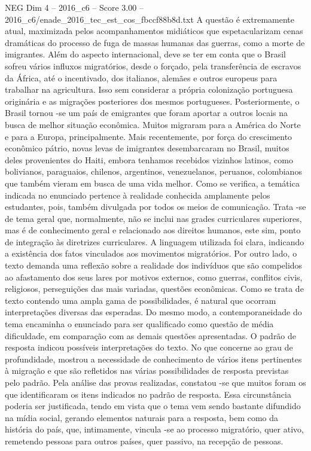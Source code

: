 \begin{textsample}{NEG Dim 4 – 2016\_c6 – Score 3.00 – 2016\_c6/enade\_2016\_tec\_est\_cos\_fbccf88b8d.txt}
A questão é extremamente atual, maximizada pelos acompanhamentos midiáticos que espetacularizam cenas dramáticas do processo de fuga de massas humanas das guerras, como a morte de imigrantes.
Além do aspecto internacional, deve se ter em conta que o Brasil sofreu vários influxos migratórios, desde o forçado, pela transferência de escravos da África, até o incentivado, dos italianos, alemães e outros europeus para trabalhar na agricultura.
Isso sem considerar a própria colonização portuguesa originária e as migrações posteriores dos mesmos portugueses.
Posteriormente, o Brasil tornou -se um país de emigrantes que foram aportar a outros locais na busca de melhor situação econômica.
Muitos migraram para a América do Norte e para a Europa, principalmente.
Mais recentemente, por força do crescimento econômico pátrio, novas levas de imigrantes desembarcaram no Brasil, muitos deles provenientes do Haiti, embora tenhamos recebidos vizinhos latinos, como bolivianos, paraguaios, chilenos, argentinos, venezuelanos, peruanos, colombianos que também vieram em busca de uma vida melhor.
Como se verifica, a temática indicada no enunciado pertence à realidade conhecida amplamente pelos estudantes, pois, também divulgada por todos os meios de comunicação.
Trata -se de tema geral que, normalmente, não se inclui nas grades curriculares superiores, mas é de conhecimento geral e relacionado aos direitos humanos, este sim, ponto de integração às diretrizes curriculares.
A linguagem utilizada foi clara, indicando a existência dos fatos vinculados aos movimentos migratórios.
Por outro lado, o texto demanda uma reflexão sobre a realidade dos indivíduos que são compelidos ao afastamento dos seus lares por motivos externos, como guerras, conflitos civis, religiosos, perseguições das mais variadas, questões econômicas.
Como se trata de texto contendo uma ampla gama de possibilidades, é natural que ocorram interpretações diversas das esperadas.
Do mesmo modo, a contemporaneidade do tema encaminha o enunciado para ser qualificado como questão de média dificuldade, em comparação com as demais questões apresentadas.
O padrão de resposta indicou possíveis interpretações do texto.
No que concerne ao grau de profundidade, mostrou a necessidade de conhecimento de vários itens pertinentes à migração e que são refletidos nas várias possibilidades de resposta previstas pelo padrão.
Pela análise das provas realizadas, constatou -se que muitos foram os que identificaram os itens indicados no padrão de resposta.
Essa circunstância poderia ser justificada, tendo em vista que o tema vem sendo bastante difundido na mídia social, gerando elementos naturais para a resposta, bem como da história do país, que, intimamente, vincula -se ao processo migratório, quer ativo, remetendo pessoas para outros países, quer passivo, na recepção de pessoas.

\end{textsample}
